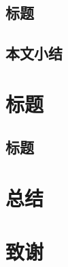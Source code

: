 \documentclass[openany,AutoFakeBold]{book}
\theoremstyle{definition}
\begin{document}
\section{标题}






\section{本文小结}



\chapter{标题}
\pagestyle{fancy}

\section{标题}



\chapter{总结}\label{ch7}
\pagestyle{fancy}

\chapter*{致谢}
\end{document}
